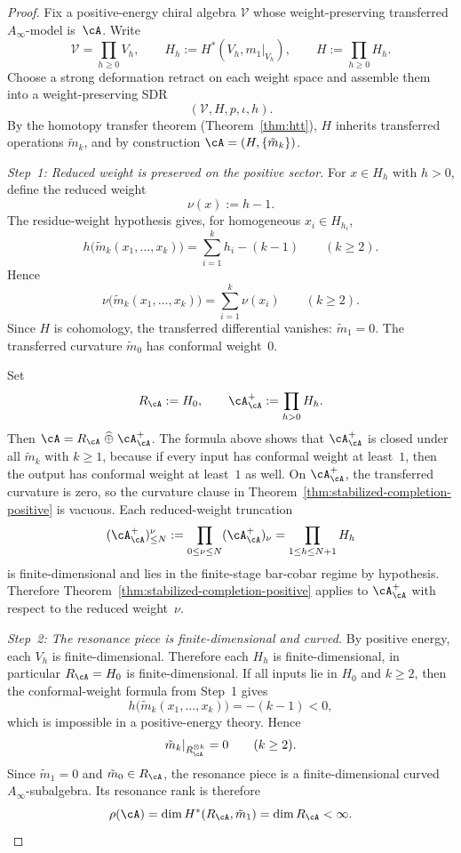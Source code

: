 \begin{proof}
Fix a positive-energy chiral algebra $\mathcal V$ whose
weight-preserving transferred $A_\infty$-model is~$\cA$.
Write
\[
\mathcal V = \prod_{h \ge 0} V_h,
\qquad
H_h := H^*(V_h, m_1|_{V_h}),
\qquad
H := \prod_{h \ge 0} H_h.
\]
Choose a strong deformation retract on each weight space and
assemble them into a weight-preserving SDR
\[
(\mathcal V, H, p, \iota, h).
\]
By the homotopy transfer theorem
\textup{(}Theorem~\ref{thm:htt}\textup{)}, $H$ inherits
transferred operations $\tilde m_k$, and by construction
$\cA = (H, \{\tilde m_k\})$.

\emph{Step~1: Reduced weight is preserved on the positive sector.}
For $x \in H_h$ with $h > 0$, define the reduced weight
\[
\nu(x) := h - 1.
\]
The residue-weight hypothesis gives, for homogeneous
$x_i\in H_{h_i}$,
\[
h\bigl(\tilde m_k(x_1, \ldots, x_k)\bigr)
=
\sum_{i=1}^k h_i - (k-1)
\qquad (k \ge 2).
\]
Hence
\[
\nu\bigl(\tilde m_k(x_1, \ldots, x_k)\bigr)
=
\sum_{i=1}^k \nu(x_i)
\qquad (k \ge 2).
\]
Since $H$ is cohomology, the transferred differential vanishes:
$\tilde m_1 = 0$. The transferred curvature $\tilde m_0$ has
conformal weight~$0$.

Set
\[
R_\cA := H_0,
\qquad
\cA^+_\cA := \prod_{h > 0} H_h.
\]
Then $\cA = R_\cA \;\widehat{\oplus}\; \cA^+_\cA$. The formula
above shows that $\cA^+_\cA$ is closed under all
$\tilde m_k$ with $k \ge 1$, because if every input has
conformal weight at least~$1$, then the output has conformal
weight at least~$1$ as well. On $\cA^+_\cA$, the transferred
curvature is zero, so the curvature clause in
Theorem~\ref{thm:stabilized-completion-positive} is vacuous.
Each reduced-weight truncation
\[
(\cA^+_\cA)_{\le N}^{\nu}
:=
\prod_{0 \le \nu \le N} (\cA^+_\cA)_\nu
=
\prod_{1 \le h \le N+1} H_h
\]
is finite-dimensional and lies in the finite-stage bar-cobar regime
by hypothesis. Therefore
Theorem~\ref{thm:stabilized-completion-positive} applies to
$\cA^+_\cA$ with respect to the reduced weight~$\nu$.

\emph{Step~2: The resonance piece is finite-dimensional and
curved.}
By positive energy, each $V_h$ is finite-dimensional. Therefore
each $H_h$ is finite-dimensional, in particular
$R_\cA = H_0$ is finite-dimensional. If all inputs lie in $H_0$
and $k \ge 2$, then the conformal-weight formula from Step~1 gives
\[
h\bigl(\tilde m_k(x_1, \ldots, x_k)\bigr) = -(k-1) < 0,
\]
which is impossible in a positive-energy theory. Hence
\[
\tilde m_k|_{R_\cA^{\otimes k}} = 0
\qquad (k \ge 2).
\]
Since $\tilde m_1 = 0$ and $\tilde m_0 \in R_\cA$, the resonance
piece is a finite-dimensional curved $A_\infty$-subalgebra.
Its resonance rank is therefore
\[
\rho(\cA)
=
\dim H^*(R_\cA, \tilde m_1)
=
\dim R_\cA
<
\infty.
\]


\end{proof}
